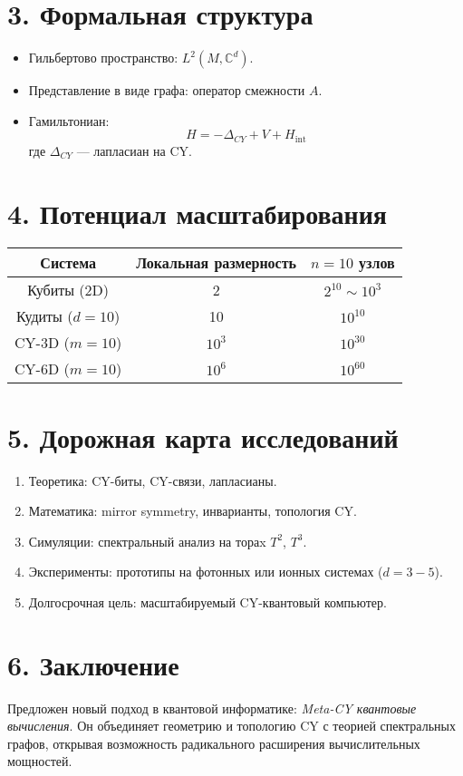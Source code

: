 \documentclass[12pt,a4paper]{article}
\begin{document}
\section*{3. Формальная структура}
\begin{itemize}
  \item Гильбертово пространство: $L^2(M, \mathbb{C}^d)$.
  \item Представление в виде графа: оператор смежности $A$.
  \item Гамильтониан:
  \[
  H = -\Delta_{CY} + V + H_{\text{int}}
  \]
  где $\Delta_{CY}$ — лапласиан на CY.
\end{itemize}

\section*{4. Потенциал масштабирования}
\begin{center}
\begin{tabular}{|c|c|c|}
\hline
Система & Локальная размерность & $n=10$ узлов \\
\hline
Кубиты (2D) & 2 & $2^{10} \sim 10^3$ \\
Кудиты ($d=10$) & 10 & $10^{10}$ \\
CY-3D ($m=10$) & $10^3$ & $10^{30}$ \\
CY-6D ($m=10$) & $10^6$ & $10^{60}$ \\
\hline
\end{tabular}
\end{center}

\section*{5. Дорожная карта исследований}
\begin{enumerate}
  \item Теоретика: CY-биты, CY-связи, лапласианы.
  \item Математика: mirror symmetry, инварианты, топология CY.
  \item Симуляции: спектральный анализ на тораx $T^2$, $T^3$.
  \item Эксперименты: прототипы на фотонных или ионных системах ($d=3-5$).
  \item Долгосрочная цель: масштабируемый CY-квантовый компьютер.
\end{enumerate}

\section*{6. Заключение}
Предложен новый подход в квантовой информатике: 
\emph{Meta-CY квантовые вычисления}.  
Он объединяет геометрию и топологию CY с теорией спектральных графов, 
открывая возможность радикального расширения вычислительных мощностей.
\end{document}
